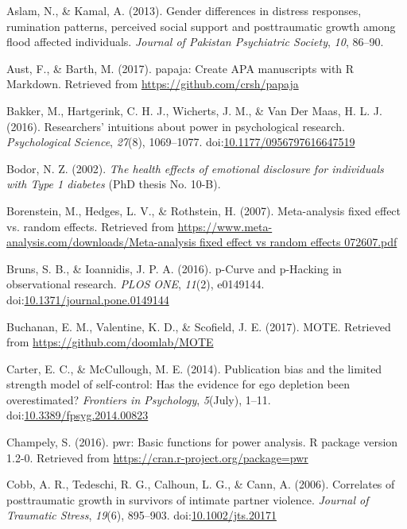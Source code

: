 \documentclass[man]{apa6}
\theoremstyle{definition}
\theoremstyle{definition}
\theoremstyle{definition}
\theoremstyle{remark}
\begin{document}
\hypertarget{ref-Aslam2013}{}
Aslam, N., \& Kamal, A. (2013). Gender differences in distress
responses, rumination patterns, perceived social support and
posttraumatic growth among flood affected individuals. \emph{Journal of
Pakistan Psychiatric Society}, \emph{10}, 86--90.

\hypertarget{ref-Aust2017}{}
Aust, F., \& Barth, M. (2017). papaja: Create APA manuscripts with R
Markdown. Retrieved from \url{https://github.com/crsh/papaja}

\hypertarget{ref-Bakker2016}{}
Bakker, M., Hartgerink, C. H. J., Wicherts, J. M., \& Van Der Maas, H.
L. J. (2016). Researchers' intuitions about power in psychological
research. \emph{Psychological Science}, \emph{27}(8), 1069--1077.
doi:\href{https://doi.org/10.1177/0956797616647519}{10.1177/0956797616647519}

\hypertarget{ref-Bodor2002}{}
Bodor, N. Z. (2002). \emph{The health effects of emotional disclosure
for individuals with Type 1 diabetes} (PhD thesis No. 10-B).

\hypertarget{ref-Borenstein2007}{}
Borenstein, M., Hedges, L. V., \& Rothstein, H. (2007). Meta-analysis
fixed effect vs. random effects. Retrieved from
\href{https://www.meta-analysis.com/downloads/Meta-analysis\%20fixed\%20effect\%20vs\%20random\%20effects\%20072607.pdf}{https://www.meta-analysis.com/downloads/Meta-analysis fixed effect vs random effects 072607.pdf}

\hypertarget{ref-Bruns2016}{}
Bruns, S. B., \& Ioannidis, J. P. A. (2016). p-Curve and p-Hacking in
observational research. \emph{PLOS ONE}, \emph{11}(2), e0149144.
doi:\href{https://doi.org/10.1371/journal.pone.0149144}{10.1371/journal.pone.0149144}

\hypertarget{ref-Buchanan2017}{}
Buchanan, E. M., Valentine, K. D., \& Scofield, J. E. (2017). MOTE.
Retrieved from \url{https://github.com/doomlab/MOTE}

\hypertarget{ref-Carter2014}{}
Carter, E. C., \& McCullough, M. E. (2014). Publication bias and the
limited strength model of self-control: Has the evidence for ego
depletion been overestimated? \emph{Frontiers in Psychology},
\emph{5}(July), 1--11.
doi:\href{https://doi.org/10.3389/fpsyg.2014.00823}{10.3389/fpsyg.2014.00823}

\hypertarget{ref-Champely2016}{}
Champely, S. (2016). pwr: Basic functions for power analysis. R package
version 1.2-0. Retrieved from
\url{https://cran.r-project.org/package=pwr}

\hypertarget{ref-Cobb2006}{}
Cobb, A. R., Tedeschi, R. G., Calhoun, L. G., \& Cann, A. (2006).
Correlates of posttraumatic growth in survivors of intimate partner
violence. \emph{Journal of Traumatic Stress}, \emph{19}(6), 895--903.
doi:\href{https://doi.org/10.1002/jts.20171}{10.1002/jts.20171}
\end{document}
